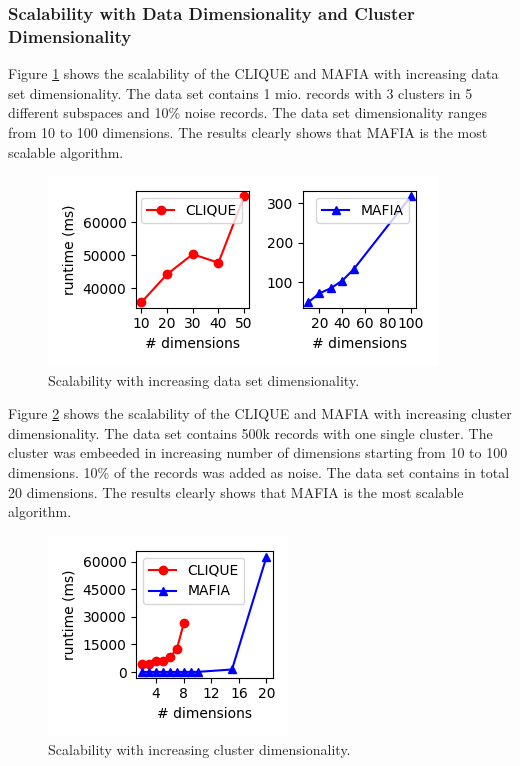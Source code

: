 \subsubsection{Scalability with Data Dimensionality and Cluster Dimensionality}
Figure \ref{fig:data_dimensionality_vs_runtime} shows the scalability of the CLIQUE and MAFIA with increasing data set dimensionality. The data set contains 1 mio. records with 3 clusters in 5 different subspaces and 10\% noise records. The data set dimensionality ranges from 10 to 100 dimensions. The results clearly shows that MAFIA is the most scalable algorithm.
\begin{figure}
    \centering
    \includegraphics[scale=0.5]{figures/data_dimensionality_vs_runtime.png}
    \caption{Scalability with increasing data set dimensionality.}
    \label{fig:data_dimensionality_vs_runtime}
\end{figure}

Figure \ref{fig:cluster_dimensionality_vs_runtime} shows the scalability of the CLIQUE and MAFIA with increasing cluster dimensionality. The data set contains 500k records with one single cluster. The cluster was embeeded in increasing number of dimensions starting from 10 to 100 dimensions. 10\% of the records was added as noise. The data set contains in total 20 dimensions. The results clearly shows that MAFIA is the most scalable algorithm.
\begin{figure}
    \centering
    \includegraphics[scale=0.5]{figures/cluster_dimensionality_vs_runtime.png}
    \caption{Scalability with increasing cluster dimensionality.}
    \label{fig:cluster_dimensionality_vs_runtime}
\end{figure}


